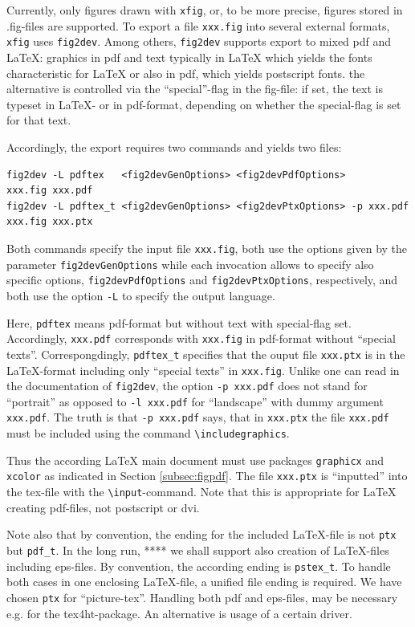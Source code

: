 \documentclass[12pt]{article}
\begin{document}
Currently, only figures drawn with {\tt xfig}, or, to be more precise, 
figures stored in .fig-files are supported. 
To export a file {\tt xxx.fig} into several external formats, 
{\tt xfig} uses {\tt fig2dev}. 
Among others, {\tt fig2dev} supports export to mixed pdf and \LaTeX{}: 
graphics in pdf 
and text typically in \LaTeX{} which yields the fonts 
characteristic for \LaTeX{} or also in pdf, 
which yields postscript fonts. 
the alternative is controlled via the ``special''-flag in the fig-file: 
if set, the text is typeset in \LaTeX- or in pdf-format, 
depending on whether the special-flag is set for that text. 


Accordingly, the export requires two commands and yields two files: 
%
\begin{Verbatim}[fontsize=\scriptsize]
fig2dev -L pdftex   <fig2devGenOptions> <fig2devPdfOptions>            xxx.fig xxx.pdf   
fig2dev -L pdftex_t <fig2devGenOptions> <fig2devPtxOptions> -p xxx.pdf xxx.fig xxx.ptx
\end{Verbatim}
%
Both commands specify the input file {\tt xxx.fig}, 
both use the options given by the parameter {\tt fig2devGenOptions} 
while each invocation allows to specify also specific options, 
{\tt fig2devPdfOptions} and {\tt fig2devPtxOptions}, respectively, 
and both use the option {\tt -L} to specify the output language. 

Here, {\tt pdftex} means pdf-format but without text with special-flag set. 
Accordingly, {\tt xxx.pdf} corresponds with {\tt xxx.fig} in pdf-format 
without ``special texts''. 
Correspongdingly, {\tt pdftex\_t} specifies 
that the ouput file {\tt xxx.ptx} is in the \LaTeX-format 
including only ``special texts'' in {\tt xxx.fig}. 
Unlike one can read in the documentation of {\tt fig2dev}, 
the option {\tt -p xxx.pdf} does not stand for ``portrait'' 
as opposed to {\tt -l xxx.pdf} for ``landscape'' 
with dummy argument {\tt xxx.pdf}. 
The truth is that {\tt -p xxx.pdf} says, 
that in {\tt xxx.ptx} the file {\tt xxx.pdf} must be included 
using the command {\tt\textbackslash includegraphics}. 

Thus the according \LaTeX{} main document 
must use packages {\tt graphicx} and {\tt xcolor} 
as indicated in Section \ref{subsec:figpdf}. 
The file {\tt xxx.ptx} is ``inputted'' into the tex-file 
with the {\tt\textbackslash input}-command. 
Note that this is appropriate for \LaTeX{} creating pdf-files, 
not postscript or dvi. 

Note also that by convention, the ending for the included \LaTeX-file 
is not {\tt ptx} but {\tt pdf\_t}. 
In the long run, **** we shall support also creation of \LaTeX-files 
including \gls{eps}-files. 
By convention, the according ending is {\tt pstex\_t}. 
To handle both cases in one enclosing \LaTeX-file, 
a unified file ending is required. 
We have chosen {\tt ptx} for ``picture-tex''. 
Handling both \gls{pdf} and \gls{eps}-files, 
may be necessary e.g. for the tex4ht-package. 
An alternative is usage of a certain driver. 
\end{document}
